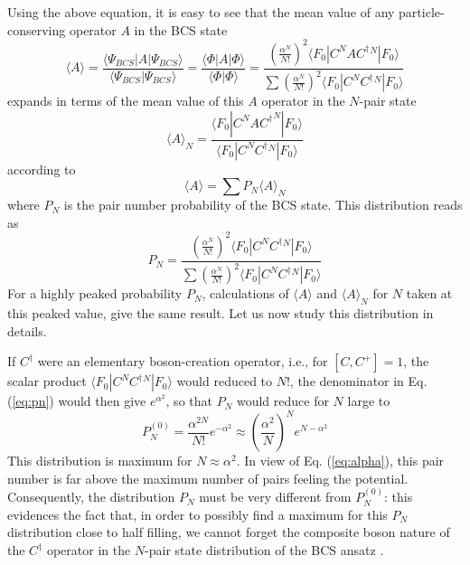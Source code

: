 \documentclass[aps,prb,preprint,groupedaddress,amsmath]{revtex4}
\newcommand{\dg}{\ensuremath{\dagger}}
\begin{document}
Using the above equation, it is easy to see that the mean value of any particle-conserving operator $A$ in the BCS state
\begin{equation}
\langle{A}\rangle=\frac{\langle\Psi_{BCS}|A|\Psi_{BCS}{\rangle}}
{\langle\Psi_{BCS}|\Psi_{BCS}{\rangle}}=\frac{\langle\Phi|A|\Phi{\rangle}}
{\langle\Phi|\Phi{\rangle}}=\frac{\left(\frac{\alpha^N}{N!}\right)^2\langle{}F_0|{C}^NA{C^\dg}{}^N|F_0{\rangle}}
{\sum{\left(\frac{\alpha^{N}}{N!}\right)^2\langle{}F_0|{C}^N{C^\dg}{}^N|F_0\rangle}}
\end{equation}
 expands in terms of the mean value of this $A$ operator in the $N$-pair state
\begin{equation}
\langle{A}\rangle_N=\frac{\langle{}F_0|C^NA{C^\dg}^N|F_0{\rangle}}
{\langle{}F_0|{C}^N{{C}^\dg}{} ^N|F_0{\rangle}}\end{equation}
according to 
\begin{equation}
\langle{A}\rangle=\sum{P_N}\langle{A}\rangle_N
\end{equation}
where $P_N$ is the pair number probability of the BCS state. This distribution reads as 
\begin{equation}\label{eq:pn}
P_N=\frac{\left(\frac{\alpha^{N}}{N!}\right)^2\langle{}F_0|{C}^N{C^\dg}{}^N|F_0{\rangle}}
{\sum{\left(\frac{\alpha^{N}}{N!}\right)^2\langle{}F_0|{C}^N{C^\dg}{}^N|F_0\rangle}}
\end{equation} 
For a highly peaked probability $P_N$, calculations of $\langle{A}\rangle$ and $\langle{A}\rangle_N$ for $N$ taken at this peaked value, give the same result. Let us now study this distribution in details. 

If $C^\dg$ were an elementary boson-creation operator, i.e., for $[{C},{C}^+]=1$, the scalar product $\langle{}F_0|{C}^N{C^\dg}{}^N|F_0{\rangle}$ would reduced to $N!$, the denominator in Eq.(\ref{eq:pn}) would then give $e^{\alpha^2}$, so that $P_N$ would reduce for $N$ large to 
\begin{equation}
 P_N^{(0)}=\frac{\alpha^{2N}}{N!}e^{-\alpha^2}\approx\left(\frac{\alpha^2}{N}\right)^Ne^{N-\alpha^2}
\end{equation}
This distribution is maximum for $N\approx\alpha^2$. In view of  Eq. (\ref{eq:alpha}), this pair number is far above the maximum number of pairs feeling the potential. Consequently, the distribution $P_N$ must be very different from $P_N^{(0)}$: this evidences the fact that, in order to possibly find a maximum for this $P_N$ distribution close to half filling, we cannot forget the composite boson nature of the $C^\dg$ operator in the $N$-pair state distribution of the BCS ansatz . 
\end{document}

